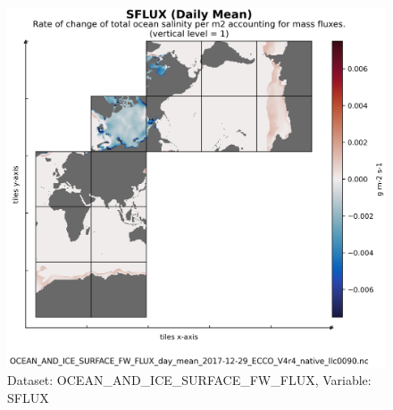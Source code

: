 \begin{figure}[H]
\centering
\includegraphics[scale=0.55]{../images/plots/native_plots/Ocean_and_Sea-Ice_Surface_Freshwater_Fluxes/SFLUX.png}
\caption{Dataset: OCEAN\_AND\_ICE\_SURFACE\_FW\_FLUX, Variable: SFLUX}
\label{tab:table-OCEAN_AND_ICE_SURFACE_FW_FLUX_SFLUX-Plot}
\end{figure}
\newpage
\pagebreak
